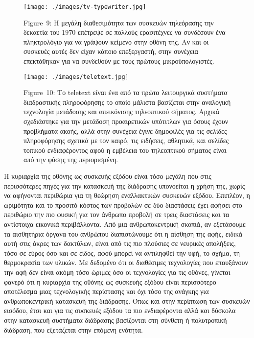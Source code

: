 \documentclass[
]{article}
\begin{document}
\leavevmode{}%
\begin{figure}
\hypertarget{fig:tv-typewriter}{%
\centering
\texttt{[image: ./images/tv-typewriter.jpg]}
\caption{Figure~9: Η μεγάλη διαθεσιμότητα των συσκευών τηλεόρασης την
δεκαετία του 1970 επέτρεψε σε πολλούς ερασιτέχνες να συνδέσουν ένα
πληκτρολόγιο για να γράψουν κείμενο στην οθόνη της. Αν και οι συσκευές
αυτές δεν είχαν κάποιο επεξεργαστή, στην συνέχεια επεκτάθηκαν για να
συνδεθούν με τους πρώτους μικροϋπολογιστές.}\label{fig:tv-typewriter}
}
\end{figure}

\leavevmode{}%
\begin{figure}
\hypertarget{fig:teletext}{%
\centering
\texttt{[image: ./images/teletext.jpg]}
\caption{Figure~10: Το teletext είναι ένα από τα πρώτα λειτουργικά
συστήματα διαδραστικής πληροφόρησης το οποίο μάλιστα βασίζεται στην
αναλογική τεχνολογία μετάδοσης και απεικόνισης τηλεοπτικού σήματος.
Αρχικά σχεδιάστηκε για την μετάδοση προαιρετικών υπότιτλων για όσους
έχουν προβλήματα ακοής, αλλά στην συνέχεια έγινε δημοφιλές για τις
σελίδες πληροφόρησης σχετικά με τον καιρό, τις ειδήσεις, αθλητικά, και
σελίδες τοπικού ενδιαφέροντος αφού η εμβέλεια του τηλεοπτικού σήματος
είναι από την φύσης της περιορισμένη.}\label{fig:teletext}
}
\end{figure}

Η κυριαρχία της οθόνης ως συσκευής εξόδου είναι τόσο μεγάλη που στις
περισσότερες πηγές για την κατασκευή της διάδρασης υπονοείται η χρήση
της, χωρίς να αφήνονται περιθώρια για τη θεώρηση εναλλακτικών συσκευών
εξόδου. Επιπλέον, η ωριμότητα και το προσιτό κόστος των προβολών σε δύο
διαστάσεις έχει αφήσει στο περιθώριο την πιο φυσική για τον άνθρωπο
προβολή σε τρεις διαστάσεις και τα αντίστοιχα εικονικά περιβάλλοντα. Από
μια ανθρωποκεντρική σκοπιά, αν εξετάσουμε τα αισθητήρια όργανα του
ανθρώπου διαπιστώνουμε ότι η αίσθηση της αφής, ειδικά αυτή στις άκρες
των δακτύλων, είναι από τις πιο πλούσιες σε νευρικές απολήξεις, τόσο σε
εύρος όσο και σε είδος, αφού μπορεί να αντιληφθεί την υφή, το σχήμα, τη
θερμοκρασία των υλικών. Με δεδομένο ότι οι διαθέσιμες τεχνολογίες που
επαυξάνουν την αφή δεν είναι ακόμη τόσο ώριμες όσο οι τεχνολογίες για
τις οθόνες, γίνεται φανερό ότι η κυριαρχία της οθόνης ως συσκευής εξόδου
είναι περισσότερο αποτέλεσμα μιας τεχνολογικής περίστασης και όχι τόσο
της ανάγκης για ανθρωποκεντρική κατασκευή της διάδρασης. Όπως και στην
περίπτωση των συσκευών εισόδου, έτσι και για τις συσκευές εξόδου τα πιο
ενδιαφέροντα αλλά και δύσκολα στην κατασκευή συστήματα διάδρασης
βασίζονται στη σύνθετη ή πολυτροπική διάδραση, που εξετάζεται στην
επόμενη ενότητα.
\end{document}
